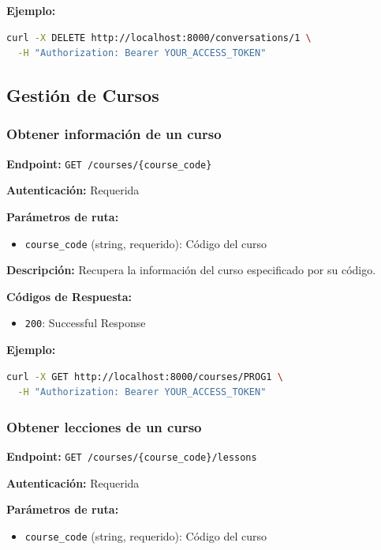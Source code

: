 \textbf{Ejemplo:}

\begin{lstlisting}[language=bash]
curl -X DELETE http://localhost:8000/conversations/1 \
  -H "Authorization: Bearer YOUR_ACCESS_TOKEN"
\end{lstlisting}

\subsection{Gestión de Cursos}
\label{subsection:A-3-Gestión de Cursos}

\subsubsection{Obtener información de un curso}
\label{subsubsection:A-3-Obtener información de un curso}

\textbf{Endpoint:} \texttt{GET /courses/\{course\_code\}}

\textbf{Autenticación:} Requerida

\textbf{Parámetros de ruta:}
\begin{itemize}
    \item \texttt{course\_code} (string, requerido): Código del curso
\end{itemize}

\textbf{Descripción:} Recupera la información del curso especificado por su código.

\textbf{Códigos de Respuesta:}
\begin{itemize}
    \item \texttt{200}: Successful Response
\end{itemize}

\textbf{Ejemplo:}

\begin{lstlisting}[language=bash]
curl -X GET http://localhost:8000/courses/PROG1 \
  -H "Authorization: Bearer YOUR_ACCESS_TOKEN"
\end{lstlisting}

\subsubsection{Obtener lecciones de un curso}
\label{subsubsection:A-3-Obtener lecciones de un curso}

\textbf{Endpoint:} \texttt{GET /courses/\{course\_code\}/lessons}

\textbf{Autenticación:} Requerida

\textbf{Parámetros de ruta:}
\begin{itemize}
    \item \texttt{course\_code} (string, requerido): Código del curso
\end{itemize}

